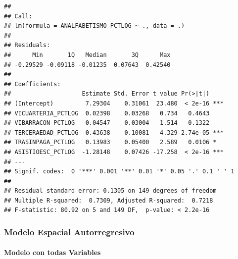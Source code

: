 \documentclass[11pt,]{article}
\newenvironment{Shaded}{\begin{snugshade}}{\end{snugshade}}
\newcommand{\KeywordTok}[1]{\textcolor[rgb]{0.13,0.29,0.53}{\textbf{#1}}}
\newcommand{\DataTypeTok}[1]{\textcolor[rgb]{0.13,0.29,0.53}{#1}}
\newcommand{\StringTok}[1]{\textcolor[rgb]{0.31,0.60,0.02}{#1}}
\newcommand{\OperatorTok}[1]{\textcolor[rgb]{0.81,0.36,0.00}{\textbf{#1}}}
\newcommand{\NormalTok}[1]{#1}
\begin{document}
\begin{verbatim}
## 
## Call:
## lm(formula = ANALFABETISMO_PCTLOG ~ ., data = .)
## 
## Residuals:
##      Min       1Q   Median       3Q      Max 
## -0.29529 -0.09118 -0.01235  0.07643  0.42540 
## 
## Coefficients:
##                    Estimate Std. Error t value Pr(>|t|)    
## (Intercept)         7.29304    0.31061  23.480  < 2e-16 ***
## VICUARTERIA_PCTLOG  0.02398    0.03268   0.734   0.4643    
## VIBARRACON_PCTLOG   0.04547    0.03004   1.514   0.1322    
## TERCERAEDAD_PCTLOG  0.43638    0.10081   4.329 2.74e-05 ***
## TRASINPAGA_PCTLOG   0.13983    0.05400   2.589   0.0106 *  
## ASISTIOESC_PCTLOG  -1.28148    0.07426 -17.258  < 2e-16 ***
## ---
## Signif. codes:  0 '***' 0.001 '**' 0.01 '*' 0.05 '.' 0.1 ' ' 1
## 
## Residual standard error: 0.1305 on 149 degrees of freedom
## Multiple R-squared:  0.7309, Adjusted R-squared:  0.7218 
## F-statistic: 80.92 on 5 and 149 DF,  p-value: < 2.2e-16
\end{verbatim}

\subsubsection{Modelo Espacial
Autorregresivo}\label{modelo-espacial-autorregresivo-1}

\paragraph{Modelo con todas
Variables}\label{modelo-con-todas-variables-1}

\begin{Shaded}
\end{Shaded}
\end{document}
